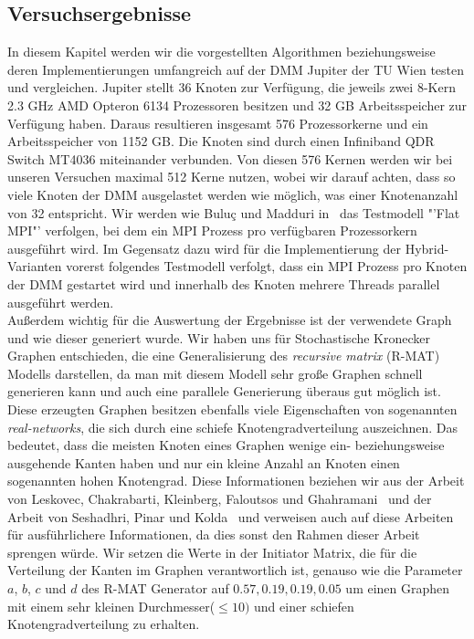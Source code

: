 \documentclass[11pt,a4paper]{article}
\begin{document}
\subsection{Versuchsergebnisse}
\label{sec:versuche}
In diesem Kapitel werden wir die vorgestellten Algorithmen beziehungsweise deren Implementierungen umfangreich auf der DMM Jupiter der TU Wien testen und vergleichen. Jupiter stellt 36 Knoten zur Verfügung, die jeweils zwei 8-Kern 2.3 GHz AMD Opteron 6134 Prozessoren besitzen und 32 GB Arbeitsspeicher zur Verfügung haben. Daraus resultieren insgesamt 576 Prozessorkerne und ein Arbeitsspeicher von 1152 GB. Die Knoten sind durch einen Infiniband QDR Switch MT4036 miteinander verbunden. Von diesen 576 Kernen werden wir bei unseren Versuchen maximal 512 Kerne nutzen, wobei wir darauf achten, dass so viele Knoten der DMM ausgelastet werden wie möglich, was einer Knotenanzahl von 32 entspricht. Wir werden wie Buluç und Madduri in~\cite{buluc} das Testmodell "'Flat MPI"' verfolgen, bei dem ein MPI Prozess pro verfügbaren Prozessorkern ausgeführt wird. Im Gegensatz dazu wird für die Implementierung der Hybrid-Varianten vorerst folgendes Testmodell verfolgt, dass ein MPI Prozess pro Knoten der DMM gestartet wird und innerhalb des Knoten mehrere Threads parallel ausgeführt werden.\\
Außerdem wichtig für die Auswertung der Ergebnisse ist der verwendete Graph und wie dieser generiert wurde. Wir haben uns für Stochastische Kronecker Graphen entschieden, die eine Generalisierung des \textit{recursive matrix} (R-MAT) Modells darstellen, da man mit diesem Modell sehr große Graphen schnell generieren kann und auch eine parallele Generierung überaus gut möglich ist. Diese erzeugten Graphen besitzen ebenfalls viele Eigenschaften von sogenannten \textit{real-networks}, die sich durch eine schiefe Knotengradverteilung auszeichnen. Das bedeutet, dass die meisten Knoten eines Graphen wenige ein- beziehungsweise ausgehende Kanten haben und nur ein kleine Anzahl an Knoten einen sogenannten hohen Knotengrad. Diese Informationen beziehen wir aus der Arbeit von Leskovec, Chakrabarti, Kleinberg, Faloutsos und Ghahramani~\cite{kronecker} und der Arbeit von Seshadhri, Pinar und Kolda~\cite{kronecker_study} und verweisen auch auf diese Arbeiten für ausführlichere Informationen, da dies sonst den Rahmen dieser Arbeit sprengen würde. Wir setzen die Werte in der Initiator Matrix, die für die Verteilung der Kanten im Graphen verantwortlich ist, genauso wie die Parameter \(a\), \(b\), \(c\) und \(d\) des R-MAT Generator auf \(0.57, 0.19, 0.19, 0.05\) um einen Graphen mit einem sehr kleinen Durchmesser(\(\leq 10)\)  und einer schiefen Knotengradverteilung zu erhalten.\\
\end{document}
